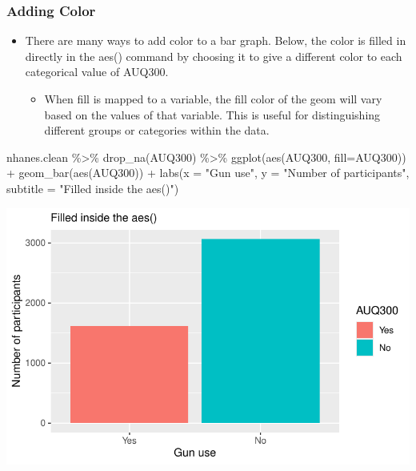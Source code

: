 \documentclass[
  letterpaper,
  DIV=11,
  numbers=noendperiod]{scrreprt}
\newenvironment{Shaded}{\begin{snugshade}}{\end{snugshade}}
\newcommand{\AttributeTok}[1]{\textcolor[rgb]{0.40,0.45,0.13}{#1}}
\newcommand{\FunctionTok}[1]{\textcolor[rgb]{0.28,0.35,0.67}{#1}}
\newcommand{\NormalTok}[1]{\textcolor[rgb]{0.00,0.23,0.31}{#1}}
\newcommand{\SpecialCharTok}[1]{\textcolor[rgb]{0.37,0.37,0.37}{#1}}
\newcommand{\StringTok}[1]{\textcolor[rgb]{0.13,0.47,0.30}{#1}}
\providecommand{\tightlist}{%
  \setlength{\itemsep}{0pt}\setlength{\parskip}{0pt}}\usepackage{longtable,booktabs,array}
\begin{document}
\subsubsection{Adding Color}\label{adding-color}

\begin{itemize}
\item
  There are many ways to add color to a bar graph. Below, the color is
  filled in directly in the aes() command by choosing it to give a
  different color to each categorical value of AUQ300.

  \begin{itemize}
  \tightlist
  \item
    When fill is mapped to a variable, the fill color of the geom will
    vary based on the values of that variable. This is useful for
    distinguishing different groups or categories within the data.
  \end{itemize}
\end{itemize}

\begin{Shaded}
\begin{Highlighting}[]
\NormalTok{nhanes.clean }\SpecialCharTok{\%\textgreater{}\%}
  \FunctionTok{drop\_na}\NormalTok{(AUQ300) }\SpecialCharTok{\%\textgreater{}\%}
  \FunctionTok{ggplot}\NormalTok{(}\FunctionTok{aes}\NormalTok{(AUQ300, }\AttributeTok{fill=}\NormalTok{AUQ300)) }\SpecialCharTok{+}
  \FunctionTok{geom\_bar}\NormalTok{(}\FunctionTok{aes}\NormalTok{(AUQ300)) }\SpecialCharTok{+}
  \FunctionTok{labs}\NormalTok{(}\AttributeTok{x =} \StringTok{"Gun use"}\NormalTok{, }\AttributeTok{y =} \StringTok{"Number of participants"}\NormalTok{, }
       \AttributeTok{subtitle =} \StringTok{"Filled inside the aes()"}\NormalTok{) }
\end{Highlighting}
\end{Shaded}

\includegraphics{dataviz_files/figure-pdf/unnamed-chunk-13-1.pdf}
\end{document}
